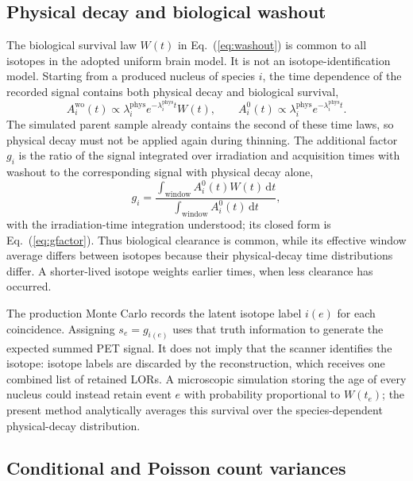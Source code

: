 \documentclass[11pt]{article}
\begin{document}
\subsection{Physical decay and biological washout}

The biological survival law $W(t)$ in Eq.~(\ref{eq:washout}) is common to all
isotopes in the adopted uniform brain model. It is not an isotope-identification
model. Starting from a produced nucleus of species $i$, the time dependence of
the recorded signal contains both physical decay and biological survival,
%
\begin{equation}
  A_i^{\mathrm{wo}}(t) \propto
  \lambda_i^{\mathrm{phys}}
  e^{-\lambda_i^{\mathrm{phys}}t} W(t),
  \qquad
  A_i^0(t) \propto
  \lambda_i^{\mathrm{phys}}
  e^{-\lambda_i^{\mathrm{phys}}t}.
  \label{eq:decay-washout}
\end{equation}
%
The simulated parent sample already contains the second of these time laws, so
physical decay must not be applied again during thinning. The additional factor
$g_i$ is the ratio of the signal integrated over irradiation and acquisition
times with washout to the corresponding signal with physical decay alone,
%
\begin{equation}
  g_i =
  \frac{\displaystyle\int_{\mathrm{window}}
        A_i^0(t)W(t)\,\mathrm{d}t}
       {\displaystyle\int_{\mathrm{window}}
        A_i^0(t)\,\mathrm{d}t},
  \label{eq:gi-ratio}
\end{equation}
%
with the irradiation-time integration understood; its closed form is
Eq.~(\ref{eq:gfactor}). Thus biological clearance is common, while its
effective window average differs between isotopes because their physical-decay
time distributions differ. A shorter-lived isotope weights earlier times,
when less clearance has occurred.

The production Monte Carlo records the latent isotope label $i(e)$ for each
coincidence. Assigning $s_e=g_{i(e)}$ uses that truth information to generate
the expected summed PET signal. It does not imply that the scanner identifies
the isotope: isotope labels are discarded by the reconstruction, which receives
one combined list of retained LORs. A microscopic simulation storing the age of
every nucleus could instead retain event $e$ with probability proportional to
$W(t_e)$; the present method analytically averages this survival over the
species-dependent physical-decay distribution.

\subsection{Conditional and Poisson count variances}
\end{document}
